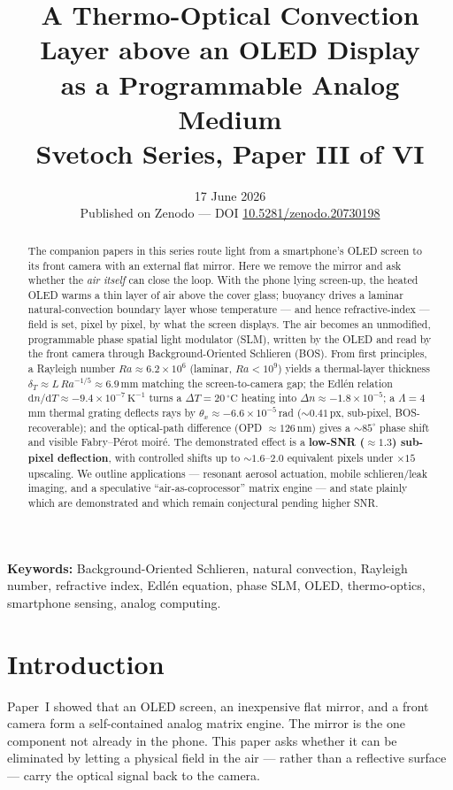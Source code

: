 \documentclass[11pt]{article}
\title{\textbf{A Thermo-Optical Convection Layer above an OLED Display\\
as a Programmable Analog Medium}\\[4pt]
{\large Svetoch Series, Paper III of VI}}
\author{\svetochauthor}
\date{17 June 2026\\[2pt]{\normalsize Published on Zenodo --- DOI \href{https://doi.org/10.5281/zenodo.20730198}{10.5281/zenodo.20730198}}}
\begin{document}
\maketitle

\begin{abstract}
\noindent The companion papers in this series route light from a smartphone's OLED screen to
its front camera with an external flat mirror. Here we remove the mirror and ask whether the
\emph{air itself} can close the loop. With the phone lying screen-up, the heated OLED warms a
thin layer of air above the cover glass; buoyancy drives a laminar natural-convection boundary
layer whose temperature --- and hence refractive-index --- field is set, pixel by pixel, by
what the screen displays. The air becomes an unmodified, programmable phase spatial light
modulator (SLM), written by the OLED and read by the front camera through Background-Oriented
Schlieren (BOS). From first principles, a Rayleigh number $Ra\approx 6.2\times10^{6}$
(laminar, $Ra<10^{9}$) yields a thermal-layer thickness $\delta_T\approx L\,Ra^{-1/5}\approx
6.9$\,mm matching the screen-to-camera gap; the Edl\'en relation $\mathrm{d}n/\mathrm{d}T\approx
-9.4\times10^{-7}\,\mathrm{K^{-1}}$ turns a $\Delta T=20\,^{\circ}\mathrm{C}$ heating into
$\Delta n\approx -1.8\times10^{-5}$; a $\Lambda=4$\,mm thermal grating deflects rays by
$\theta_x\approx -6.6\times10^{-5}$\,rad ($\sim0.41$\,px, sub-pixel, BOS-recoverable); and the
optical-path difference (OPD $\approx126$\,nm) gives a $\sim85^{\circ}$ phase shift and visible
Fabry--P\'erot moir\'e. The demonstrated effect is a \textbf{low-SNR ($\approx1.3$) sub-pixel
deflection}, with controlled shifts up to $\sim1.6$--$2.0$ equivalent pixels under $\times15$
upscaling. We outline applications --- resonant aerosol actuation, mobile schlieren/leak
imaging, and a speculative ``air-as-coprocessor'' matrix engine --- and state plainly which are
demonstrated and which remain conjectural pending higher SNR.
\end{abstract}

\noindent\textbf{Keywords:} Background-Oriented Schlieren, natural convection, Rayleigh number,
refractive index, Edl\'en equation, phase SLM, OLED, thermo-optics, smartphone sensing, analog
computing.

\section{Introduction}
Paper~I showed that an OLED screen, an inexpensive flat mirror, and a front camera form a self-contained
analog matrix engine. The mirror is the one component not already in the phone. This paper asks
whether it can be eliminated by letting a physical field in the air --- rather than a reflective
surface --- carry the optical signal back to the camera.
\end{document}
